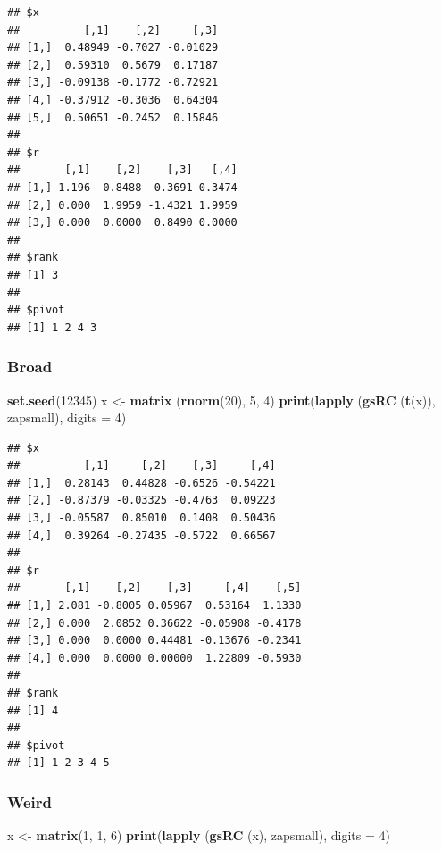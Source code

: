 \documentclass[12pt,]{article}
\newenvironment{Shaded}{\begin{snugshade}}{\end{snugshade}}
\newcommand{\KeywordTok}[1]{\textcolor[rgb]{0.13,0.29,0.53}{\textbf{#1}}}
\newcommand{\DataTypeTok}[1]{\textcolor[rgb]{0.13,0.29,0.53}{#1}}
\newcommand{\DecValTok}[1]{\textcolor[rgb]{0.00,0.00,0.81}{#1}}
\newcommand{\StringTok}[1]{\textcolor[rgb]{0.31,0.60,0.02}{#1}}
\newcommand{\NormalTok}[1]{#1}
\begin{document}
\begin{verbatim}
## $x
##          [,1]    [,2]     [,3]
## [1,]  0.48949 -0.7027 -0.01029
## [2,]  0.59310  0.5679  0.17187
## [3,] -0.09138 -0.1772 -0.72921
## [4,] -0.37912 -0.3036  0.64304
## [5,]  0.50651 -0.2452  0.15846
## 
## $r
##       [,1]    [,2]    [,3]   [,4]
## [1,] 1.196 -0.8488 -0.3691 0.3474
## [2,] 0.000  1.9959 -1.4321 1.9959
## [3,] 0.000  0.0000  0.8490 0.0000
## 
## $rank
## [1] 3
## 
## $pivot
## [1] 1 2 4 3
\end{verbatim}

\subsubsection{Broad}\label{broad}

\begin{Shaded}
\begin{Highlighting}[]
\KeywordTok{set.seed}\NormalTok{(}\DecValTok{12345}\NormalTok{)}
\NormalTok{x <-}\StringTok{ }\KeywordTok{matrix}\NormalTok{ (}\KeywordTok{rnorm}\NormalTok{(}\DecValTok{20}\NormalTok{), }\DecValTok{5}\NormalTok{, }\DecValTok{4}\NormalTok{)}
\KeywordTok{print}\NormalTok{(}\KeywordTok{lapply}\NormalTok{ (}\KeywordTok{gsRC}\NormalTok{ (}\KeywordTok{t}\NormalTok{(x)), zapsmall), }\DataTypeTok{digits =} \DecValTok{4}\NormalTok{)}
\end{Highlighting}
\end{Shaded}

\begin{verbatim}
## $x
##          [,1]     [,2]    [,3]     [,4]
## [1,]  0.28143  0.44828 -0.6526 -0.54221
## [2,] -0.87379 -0.03325 -0.4763  0.09223
## [3,] -0.05587  0.85010  0.1408  0.50436
## [4,]  0.39264 -0.27435 -0.5722  0.66567
## 
## $r
##       [,1]    [,2]    [,3]     [,4]    [,5]
## [1,] 2.081 -0.8005 0.05967  0.53164  1.1330
## [2,] 0.000  2.0852 0.36622 -0.05908 -0.4178
## [3,] 0.000  0.0000 0.44481 -0.13676 -0.2341
## [4,] 0.000  0.0000 0.00000  1.22809 -0.5930
## 
## $rank
## [1] 4
## 
## $pivot
## [1] 1 2 3 4 5
\end{verbatim}

\subsubsection{Weird}\label{weird}

\begin{Shaded}
\begin{Highlighting}[]
\NormalTok{x <-}\StringTok{ }\KeywordTok{matrix}\NormalTok{(}\DecValTok{1}\NormalTok{, }\DecValTok{1}\NormalTok{, }\DecValTok{6}\NormalTok{)}
\KeywordTok{print}\NormalTok{(}\KeywordTok{lapply}\NormalTok{ (}\KeywordTok{gsRC}\NormalTok{ (x), zapsmall), }\DataTypeTok{digits =} \DecValTok{4}\NormalTok{)}
\end{Highlighting}
\end{Shaded}
\end{document}
